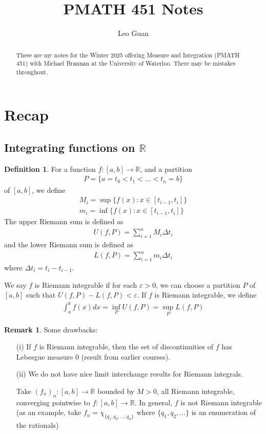 \documentclass[11pt]{amsart}
\author{Leo Guan}
\title{PMATH 451 Notes}
\theoremstyle{definition}
\newtheorem{definition}[theorem]{Definition}
\newtheorem{remark}[theorem]{Remark}
\numberwithin{equation}{section}
\begin{document}
\begin{abstract}
    These are my notes for the Winter 2025 offering Measure and Integration (PMATH 451) with Michael Brannan at the University of Waterloo. There may be mistakes throughout.
\end{abstract}
\maketitle
\tableofcontents
\section{Recap}
\subsection{Integrating functions on \texorpdfstring{$\mathbb R$}{R}}
\begin{definition}
    For a function $f:[a,b]\to\mathbb R$, and a partition 
    \begin{align*}
        P=\{a=t_0<t_1<\ldots<t_n=b\}
    \end{align*}
    of $[a,b]$, we define 
    \begin{align*}
        M_i=\sup\{f(x):x\in[t_{i-1},t_i]\}\\
        m_i=\inf\{f(x):x\in[t_{i-1},t_i]\}
    \end{align*}
    The upper Riemann sum is defined as 
    \begin{align*}
        U(f,P)=\sum_{i=1}^nM_i\Delta t_i
    \end{align*}
    and the lower Riemann sum is defined as 
    \begin{align*}
        L(f,P)=\sum_{i=1}^nm_i\Delta t_i
    \end{align*}
    where $\Delta t_i=t_i-t_{i-1}$.

    We say $f$ is Riemann integrable if for each $\varepsilon>0$, we can choose a partition $P$ of $[a,b]$ such that $U(f,P)-L(f,P)<\varepsilon$. If $f$ is Riemann integrable, we define 
    \begin{align*}
        \int_{a}^{b}f(x)dx=\inf_PU(f,P)=\sup_PL(f,P)
    \end{align*}
\end{definition}
\begin{remark}
    Some drawbacks:
    \begin{enumerate}
        \item [(i)] If $f$ is Riemann integrable, then the set of discontinuities of $f$ has Lebesgue measure 0 (result from earlier courses).
        \item [(ii)] We do not have nice limit interchange results for Riemann integrals.

        Take $(f_n)_n:[a,b]\to\mathbb R$ bounded by $M>0$, all Riemann integrable, converging pointwise to $f:[a,b]\to\mathbb R$. In general, $f$ is not Riemann integrable (as an example, take $f_n=\chi_{\{q_1,q_2,\ldots,q_n\}}$ where $\{q_1,q_2,\ldots\}$ is an enumeration of the rationals) 
    \end{enumerate}
\end{remark}
\end{document}
